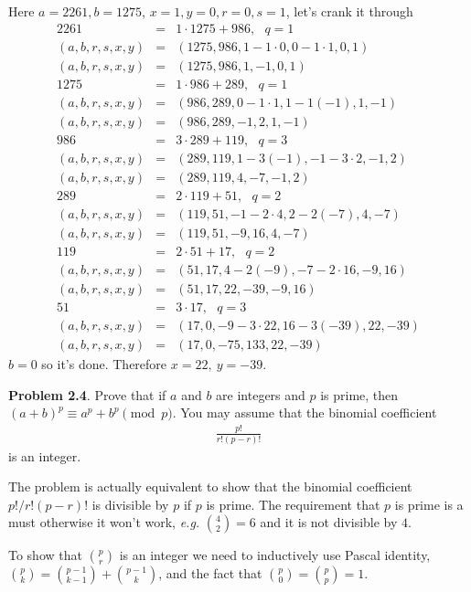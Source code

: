 \documentclass[aps,preprint,preprintnumbers,nofootinbib,showpacs,prd]{revtex4-1}
\newcommand{\eg}{{\it e.g.} }
\newcommand{\nbea}{\begin{eqnarray*}}
\newcommand{\neea}{\end{eqnarray*}}
\begin{document}
Here $a = 2261, b=1275$, $x = 1, y = 0, r = 0, s = 1$, let's crank it through
%
\nbea
2261 & = & 1 \cdot 1275 + 986, ~~~ q = 1\\
(a, b, r, s, x, y) & = & (1275, 986, 1 - 1\cdot 0, 0-1\cdot 1, 0, 1) \\
(a, b, r, s, x, y) & = & (1275, 986, 1, -1, 0, 1) \\
1275 & = & 1 \cdot 986 + 289, ~~~ q = 1 \\
(a, b, r, s, x, y) & = & (986, 289, 0 - 1\cdot 1, 1-1(-1), 1, -1) \\
(a, b, r, s, x, y) & = & (986, 289, -1, 2, 1, -1)\\
986 & = & 3 \cdot 289 + 119, ~~~ q = 3 \\
(a, b, r, s, x, y) & = & (289, 119, 1 - 3(-1), -1-3 \cdot 2, -1, 2) \\
(a, b, r, s, x, y) & = & (289, 119, 4, -7, -1, 2) \\
289 & = & 2 \cdot 119 + 51, ~~~ q = 2 \\
(a, b, r, s, x, y) & = & (119, 51, -1 - 2\cdot 4, 2-2 (-7), 4, -7) \\
(a, b, r, s, x, y) & = & (119, 51, -9, 16, 4, -7) \\
119 & = & 2 \cdot 51 + 17, ~~~ q = 2 \\
(a, b, r, s, x, y) & = & (51, 17, 4 - 2(-9), -7-2\cdot 16, -9, 16) \\
(a, b, r, s, x, y) & = & (51, 17, 22, -39, -9, 16) \\
51 & = & 3 \cdot 17, ~~~ q = 3 \\
(a, b, r, s, x, y) & = & (17, 0, -9 - 3 \cdot 22, 16-3(-39), 22, -39) \\
(a, b, r, s, x, y) & = & (17, 0, -75, 133, 22, -39)
\neea
%
$b = 0$ so it's done. Therefore $x = 22,~y = -39$.

{\bf Problem 2.4}. Prove that if $a$ and $b$ are integers and $p$ is prime, then $(a+b)^p \equiv a^p + b^p \pmod{p}$. You may assume that the binomial coefficient
%
\nbea
\frac{p!}{r!(p-r)!}
\neea
%
is an integer.

The problem is actually equivalent to show that the binomial coefficient $p!/r!(p-r)!$ is divisible by $p$ if $p$ is prime. The requirement that $p$ is prime is a must otherwise it won't work, \eg $\binom{4}{2} = 6$ and it is not divisible by $4$.

To show that $\binom{p}{r}$ is an integer we need to inductively use Pascal identity, $\binom{p}{k} = \binom{p - 1}{k - 1} + \binom{p - 1}{k}$, and the fact that $\binom{p}{0} = \binom{p}{p} = 1$.
\end{document}
